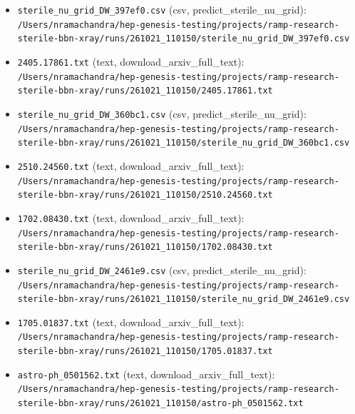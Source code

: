 \documentclass[11pt,a4paper]{article}
\begin{document}
\begin{itemize}
  \item \texttt{sterile\_\allowbreak{}nu\_\allowbreak{}grid\_\allowbreak{}DW\_\allowbreak{}397ef0.csv} (csv, predict\_sterile\_nu\_grid): \texttt{/\allowbreak{}Users/\allowbreak{}nramachandra/\allowbreak{}hep-genesis-testing/\allowbreak{}projects/\allowbreak{}ramp-research-sterile-bbn-xray/\allowbreak{}runs/\allowbreak{}261021\_\allowbreak{}110150/\allowbreak{}sterile\_\allowbreak{}nu\_\allowbreak{}grid\_\allowbreak{}DW\_\allowbreak{}397ef0.csv}
  \item \texttt{2405.17861.txt} (text, download\_arxiv\_full\_text): \texttt{/\allowbreak{}Users/\allowbreak{}nramachandra/\allowbreak{}hep-genesis-testing/\allowbreak{}projects/\allowbreak{}ramp-research-sterile-bbn-xray/\allowbreak{}runs/\allowbreak{}261021\_\allowbreak{}110150/\allowbreak{}2405.17861.txt}
  \item \texttt{sterile\_\allowbreak{}nu\_\allowbreak{}grid\_\allowbreak{}DW\_\allowbreak{}360bc1.csv} (csv, predict\_sterile\_nu\_grid): \texttt{/\allowbreak{}Users/\allowbreak{}nramachandra/\allowbreak{}hep-genesis-testing/\allowbreak{}projects/\allowbreak{}ramp-research-sterile-bbn-xray/\allowbreak{}runs/\allowbreak{}261021\_\allowbreak{}110150/\allowbreak{}sterile\_\allowbreak{}nu\_\allowbreak{}grid\_\allowbreak{}DW\_\allowbreak{}360bc1.csv}
  \item \texttt{2510.24560.txt} (text, download\_arxiv\_full\_text): \texttt{/\allowbreak{}Users/\allowbreak{}nramachandra/\allowbreak{}hep-genesis-testing/\allowbreak{}projects/\allowbreak{}ramp-research-sterile-bbn-xray/\allowbreak{}runs/\allowbreak{}261021\_\allowbreak{}110150/\allowbreak{}2510.24560.txt}
  \item \texttt{1702.08430.txt} (text, download\_arxiv\_full\_text): \texttt{/\allowbreak{}Users/\allowbreak{}nramachandra/\allowbreak{}hep-genesis-testing/\allowbreak{}projects/\allowbreak{}ramp-research-sterile-bbn-xray/\allowbreak{}runs/\allowbreak{}261021\_\allowbreak{}110150/\allowbreak{}1702.08430.txt}
  \item \texttt{sterile\_\allowbreak{}nu\_\allowbreak{}grid\_\allowbreak{}DW\_\allowbreak{}2461e9.csv} (csv, predict\_sterile\_nu\_grid): \texttt{/\allowbreak{}Users/\allowbreak{}nramachandra/\allowbreak{}hep-genesis-testing/\allowbreak{}projects/\allowbreak{}ramp-research-sterile-bbn-xray/\allowbreak{}runs/\allowbreak{}261021\_\allowbreak{}110150/\allowbreak{}sterile\_\allowbreak{}nu\_\allowbreak{}grid\_\allowbreak{}DW\_\allowbreak{}2461e9.csv}
  \item \texttt{1705.01837.txt} (text, download\_arxiv\_full\_text): \texttt{/\allowbreak{}Users/\allowbreak{}nramachandra/\allowbreak{}hep-genesis-testing/\allowbreak{}projects/\allowbreak{}ramp-research-sterile-bbn-xray/\allowbreak{}runs/\allowbreak{}261021\_\allowbreak{}110150/\allowbreak{}1705.01837.txt}
  \item \texttt{astro-ph\_\allowbreak{}0501562.txt} (text, download\_arxiv\_full\_text): \texttt{/\allowbreak{}Users/\allowbreak{}nramachandra/\allowbreak{}hep-genesis-testing/\allowbreak{}projects/\allowbreak{}ramp-research-sterile-bbn-xray/\allowbreak{}runs/\allowbreak{}261021\_\allowbreak{}110150/\allowbreak{}astro-ph\_\allowbreak{}0501562.txt}
\end{itemize}
\end{document}
